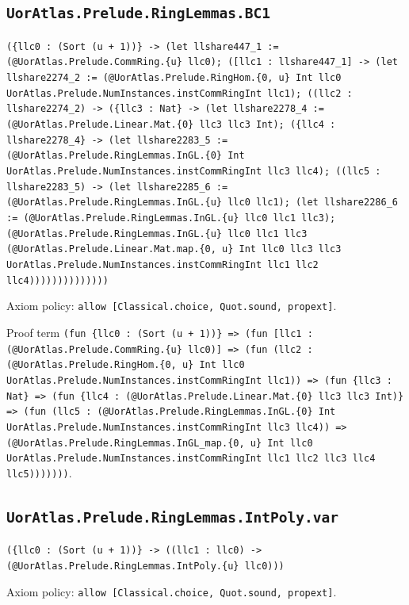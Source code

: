 \documentclass[11pt]{article}
\begin{document}
\subsection*{\texttt{UorAtlas.Prelude.RingLemmas.BC1}}
\noindent\texttt{(\{llc0 : (Sort (u + 1))\} -> (let llshare447\_1 := (@UorAtlas.Prelude.CommRing.\{u\} llc0); ([llc1 : llshare447\_1] -> (let llshare2274\_2 := (@UorAtlas.Prelude.RingHom.\{0, u\} Int llc0 UorAtlas.Prelude.NumInstances.instCommRingInt llc1); ((llc2 : llshare2274\_2) -> (\{llc3 : Nat\} -> (let llshare2278\_4 := (@UorAtlas.Prelude.Linear.Mat.\{0\} llc3 llc3 Int); (\{llc4 : llshare2278\_4\} -> (let llshare2283\_5 := (@UorAtlas.Prelude.RingLemmas.InGL.\{0\} Int UorAtlas.Prelude.NumInstances.instCommRingInt llc3 llc4); ((llc5 : llshare2283\_5) -> (let llshare2285\_6 := (@UorAtlas.Prelude.RingLemmas.InGL.\{u\} llc0 llc1); (let llshare2286\_6 := (@UorAtlas.Prelude.RingLemmas.InGL.\{u\} llc0 llc1 llc3); (@UorAtlas.Prelude.RingLemmas.InGL.\{u\} llc0 llc1 llc3 (@UorAtlas.Prelude.Linear.Mat.map.\{0, u\} Int llc0 llc3 llc3 UorAtlas.Prelude.NumInstances.instCommRingInt llc1 llc2 llc4))))))))))))))}\par
\noindent Axiom policy: \texttt{allow [Classical.choice, Quot.sound, propext]}.\par
\noindent Proof term \texttt{(fun \{llc0 : (Sort (u + 1))\} => (fun [llc1 : (@UorAtlas.Prelude.CommRing.\{u\} llc0)] => (fun (llc2 : (@UorAtlas.Prelude.RingHom.\{0, u\} Int llc0 UorAtlas.Prelude.NumInstances.instCommRingInt llc1)) => (fun \{llc3 : Nat\} => (fun \{llc4 : (@UorAtlas.Prelude.Linear.Mat.\{0\} llc3 llc3 Int)\} => (fun (llc5 : (@UorAtlas.Prelude.RingLemmas.InGL.\{0\} Int UorAtlas.Prelude.NumInstances.instCommRingInt llc3 llc4)) => (@UorAtlas.Prelude.RingLemmas.InGL\_map.\{0, u\} Int llc0 UorAtlas.Prelude.NumInstances.instCommRingInt llc1 llc2 llc3 llc4 llc5)))))))}.\par
\subsection*{\texttt{UorAtlas.Prelude.RingLemmas.IntPoly.var}}
\noindent\texttt{(\{llc0 : (Sort (u + 1))\} -> ((llc1 : llc0) -> (@UorAtlas.Prelude.RingLemmas.IntPoly.\{u\} llc0)))}\par
\noindent Axiom policy: \texttt{allow [Classical.choice, Quot.sound, propext]}.\par
\end{document}
